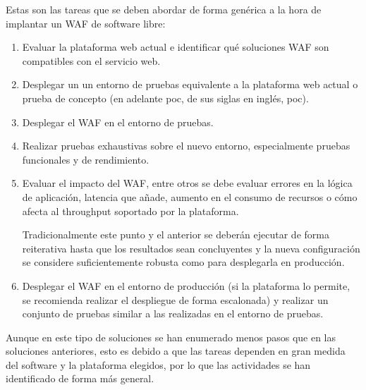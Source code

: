 \par Estas son las tareas que se deben abordar de forma genérica a la hora de implantar un WAF de software libre:
\begin{enumerate}
  \item Evaluar la plataforma web actual e identificar qué soluciones WAF son compatibles con el servicio web.
  \item Desplegar un un entorno de pruebas equivalente a la plataforma web actual o prueba de concepto (en adelante \acrshort{poc}, de sus
    siglas en inglés, \acrlong{poc}).
  \item Desplegar el WAF en el entorno de pruebas.
  \item Realizar pruebas exhaustivas sobre el nuevo entorno, especialmente pruebas funcionales y de rendimiento.
  \item Evaluar el impacto del WAF, entre otros se debe evaluar errores en la lógica de aplicación, latencia que añade, aumento en el consumo
    de recursos o cómo afecta al throughput soportado por la plataforma.
    \par Tradicionalmente este punto y el anterior se deberán ejecutar de forma reiterativa hasta que los resultados sean concluyentes y la
    nueva configuración se considere suficientemente robusta como para desplegarla en producción.
  \item Desplegar el WAF en el entorno de producción (si la plataforma lo permite, se recomienda realizar el despliegue de forma escalonada) y
    realizar un conjunto de pruebas similar a las realizadas en el entorno de pruebas.
\end{enumerate}

\par Aunque en este tipo de soluciones se han enumerado menos pasos que en las soluciones anteriores, esto es debido a que las tareas dependen
en gran medida del software y la plataforma elegidos, por lo que las actividades se han identificado de forma más general.

